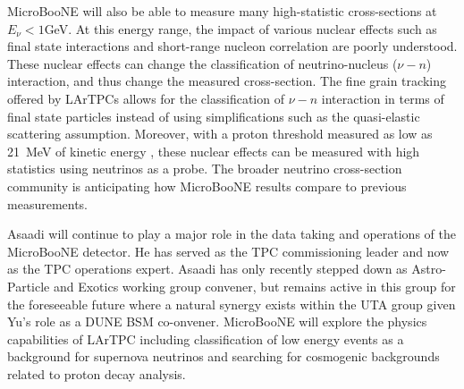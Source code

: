 MicroBooNE will also be able to measure many high-statistic cross-sections at $E_{\nu} < 1$GeV. At this energy range, the impact of various nuclear effects such as final state interactions and short-range nucleon correlation are poorly understood. These nuclear effects can change the classification of neutrino-nucleus ($\nu-n$) interaction, and thus change the measured cross-section. The fine grain tracking offered by LArTPCs allows for the classification of $\nu-n$ interaction in terms of final state particles instead of using simplifications such as the quasi-elastic scattering assumption. Moreover, with a proton threshold measured as low as 21~MeV of kinetic energy \cite{if:ArgoneutDetector}, these nuclear effects can be measured with high statistics using neutrinos as a probe. The broader neutrino cross-section community is anticipating how MicroBooNE results compare to previous measurements.


\label{sec:UbooneOperations}
Asaadi will continue to play a major role in the data taking and operations of the MicroBooNE detector.  He has served as the TPC commissioning leader and now as the TPC operations expert. Asaadi has only recently stepped down as Astro-Particle and Exotics working group convener, but remains active in this group for the foreseeable future where a natural synergy exists within the UTA group given Yu's role as a DUNE BSM co-onvener. MicroBooNE will explore the physics capabilities of LArTPC including classification of low energy events as a background for supernova neutrinos and searching for cosmogenic backgrounds related to proton decay analysis.

